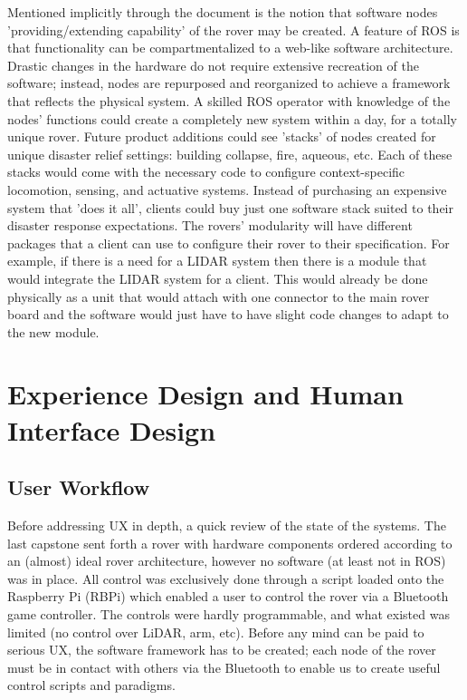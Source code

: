 \documentclass[a4paper, 10pt]{article}
\begin{document}
	Mentioned implicitly through the document is the notion that software nodes 'providing/extending capability' of the rover may be created. A feature of ROS is that functionality can be compartmentalized to a web-like software architecture. Drastic changes in the hardware do not require extensive recreation of the software; instead, nodes are repurposed and reorganized to achieve a framework that reflects the physical system. A skilled ROS operator with knowledge of the nodes' functions could create a completely new system within a day, for a totally unique rover. Future product additions could see 'stacks' of nodes created for unique disaster relief settings: building collapse, fire, aqueous, etc. Each of these stacks would come with the necessary code to configure context-specific locomotion, sensing, and actuative systems. Instead of purchasing an expensive system that 'does it all', clients could buy just one software stack suited to their disaster response expectations. 
	The rovers' modularity will have different packages that a client can use to configure their rover to their specification. For example, if there is a need for a LIDAR system then there is a module that would integrate the LIDAR system for a client. This would already be done physically as a unit that would attach with one connector to the main rover board and the software would just have to have slight code changes to adapt to the new module. 

\pagebreak
	
\section{Experience Design and Human Interface Design}
	\subsection{User Workflow}
	Before addressing UX in depth, a quick review of the state of the systems. The last capstone sent forth a rover with hardware components ordered according to an (almost) ideal rover architecture, however no software (at least not in ROS) was in place. All control was exclusively done through a script loaded onto the Raspberry Pi (RBPi) which enabled a user to control the rover via a Bluetooth game controller. The controls were hardly programmable, and what existed was limited (no control over LiDAR, arm, etc). Before any mind can be paid to serious UX, the software framework has to be created; each node of the rover must be in contact with others via the Bluetooth to enable us to create useful control scripts and paradigms.  
\end{document}
